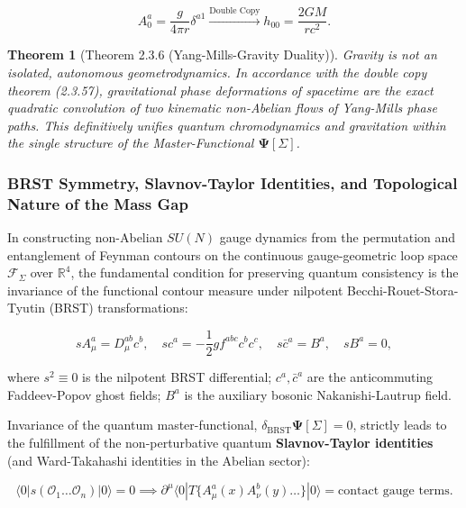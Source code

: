 \documentclass[11pt,a4paper]{article}
\newtheorem{theorem}{Theorem}[section]
\theoremstyle{definition}
\begin{document}
\begin{equation}\label{eq:2.3.59}\tag{2.3.59}
A_0^a = \frac{g}{4\pi r} \delta^{a1} \xrightarrow{\text{Double Copy}} h_{00} = \frac{2 G M}{r c^2}.
\end{equation}

\begin{theorem}[Theorem 2.3.6 (Yang-Mills-Gravity Duality)]\label{thm:2.3.6}
Gravity is not an isolated, autonomous geometrodynamics. In accordance with the double copy theorem (2.3.57), gravitational phase deformations of spacetime are the exact quadratic convolution of two kinematic non-Abelian flows of Yang-Mills phase paths. This definitively unifies quantum chromodynamics and gravitation within the single structure of the Master-Functional $\mathbf{\Psi}[\Sigma]$.
\end{theorem}

\subsubsection{BRST Symmetry, Slavnov-Taylor Identities, and Topological Nature of the Mass Gap}\label{sec:2.3.10}

In constructing non-Abelian $SU(N)$ gauge dynamics from the permutation and entanglement of Feynman contours on the continuous gauge-geometric loop space $\mathcal{F}_{\Sigma}$ over $\mathbb{R}^4$, the fundamental condition for preserving quantum consistency is the invariance of the functional contour measure under nilpotent Becchi-Rouet-Stora-Tyutin (BRST) transformations:

\begin{equation}\label{eq:2.3.60}\tag{2.3.60}
s A_\mu^a = D_\mu^{ab} c^b, \quad s c^a = -\frac{1}{2} g f^{abc} c^b c^c, \quad s \bar{c}^a = B^a, \quad s B^a = 0,
\end{equation}

where $s^2 \equiv 0$ is the nilpotent BRST differential;  
$c^a, \bar{c}^a$ are the anticommuting Faddeev-Popov ghost fields;  
$B^a$ is the auxiliary bosonic Nakanishi-Lautrup field.

Invariance of the quantum master-functional, $\delta_{\text{BRST}} \mathbf{\Psi}[\Sigma] = 0$, strictly leads to the fulfillment of the non-perturbative quantum \textbf{Slavnov-Taylor identities} (and Ward-Takahashi identities in the Abelian sector):

\begin{equation}\label{eq:2.3.61}\tag{2.3.61}
\langle 0 | s \left( \mathcal{O}_1 \dots \mathcal{O}_n \right) | 0 \rangle = 0 \implies \partial^\mu \langle 0 | T \{ A_\mu^a(x) A_\nu^b(y) \dots \} | 0 \rangle = \text{contact gauge terms}.
\end{equation}
\end{document}

